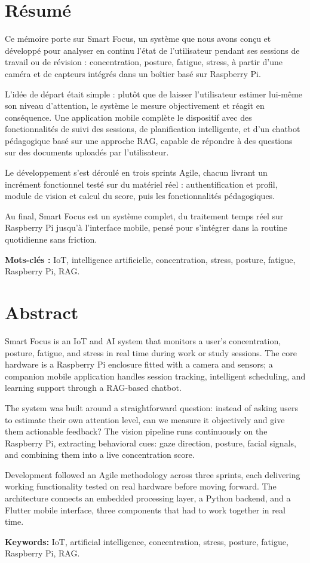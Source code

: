 \chapter*{Résumé}

  Ce mémoire porte sur Smart Focus, un système que nous avons conçu et développé pour analyser en continu l'état de l'utilisateur pendant ses sessions de
  travail ou de révision : concentration, posture, fatigue, stress, à partir d'une caméra et de capteurs intégrés dans un boîtier basé sur Raspberry Pi.

  L'idée de départ était simple : plutôt que de laisser l'utilisateur estimer lui-même son niveau d'attention, le système le mesure objectivement et réagit en
  conséquence. Une application mobile complète le dispositif avec des fonctionnalités de suivi des sessions, de planification intelligente, et d'un chatbot
  pédagogique basé sur une approche \ac{RAG}, capable de répondre à des questions sur des documents uploadés par l'utilisateur.

  Le développement s'est déroulé en trois sprints Agile, chacun livrant un incrément fonctionnel testé sur du matériel réel : authentification et profil,
  module de vision et calcul du score, puis les fonctionnalités pédagogiques.

  Au final, Smart Focus est un système complet, du traitement temps réel sur Raspberry Pi jusqu'à l'interface mobile, pensé pour s'intégrer dans la routine
  quotidienne sans friction.

\bigskip
\noindent
\textbf{Mots-clés :} IoT, intelligence artificielle, concentration, stress, posture, fatigue, Raspberry Pi, RAG.

\cleardoublepage

\chapter*{Abstract}

  Smart Focus is an IoT and AI system that monitors a user's concentration, posture, fatigue, and stress in real time during work or study sessions. The core
  hardware is a Raspberry Pi enclosure fitted with a camera and sensors; a companion mobile application handles session tracking, intelligent scheduling, and
  learning support through a RAG-based chatbot.

  The system was built around a straightforward question: instead of asking users to estimate their own attention level, can we measure it objectively and give
   them actionable feedback? The vision pipeline runs continuously on the Raspberry Pi, extracting behavioral cues: gaze direction, posture, facial signals,
  and combining them into a live concentration score.

  Development followed an Agile methodology across three sprints, each delivering working functionality tested on real hardware before moving forward. The
  architecture connects an embedded processing layer, a Python backend, and a Flutter mobile interface, three components that had to work together in real
  time.

\bigskip
\noindent
\textbf{Keywords:} IoT, artificial intelligence, concentration, stress, posture, fatigue, Raspberry Pi, RAG.